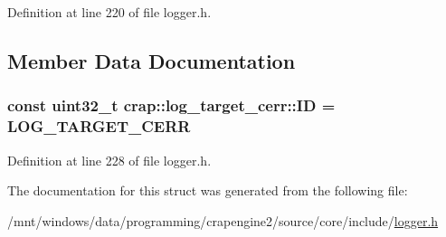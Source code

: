 Definition at line 220 of file logger.\+h.



\subsection{Member Data Documentation}
\hypertarget{structcrap_1_1log__target__cerr_a33b6b749a34b045309cd086d81fa672a}{
\subsubsection[{I\+D}]{\setlength{\rightskip}{0pt plus 5cm}const uint32\+\_\+t crap\+::log\+\_\+target\+\_\+cerr\+::\+I\+D = {\bf L\+O\+G\+\_\+\+T\+A\+R\+G\+E\+T\+\_\+\+C\+E\+R\+R}\hspace{0.3cm}{\ttfamily [static]}}}\label{structcrap_1_1log__target__cerr_a33b6b749a34b045309cd086d81fa672a}


Definition at line 228 of file logger.\+h.



The documentation for this struct was generated from the following file\+:\begin{DoxyCompactItemize}
\item 
/mnt/windows/data/programming/crapengine2/source/core/include/\hyperlink{logger_8h}{logger.\+h}\end{DoxyCompactItemize}
